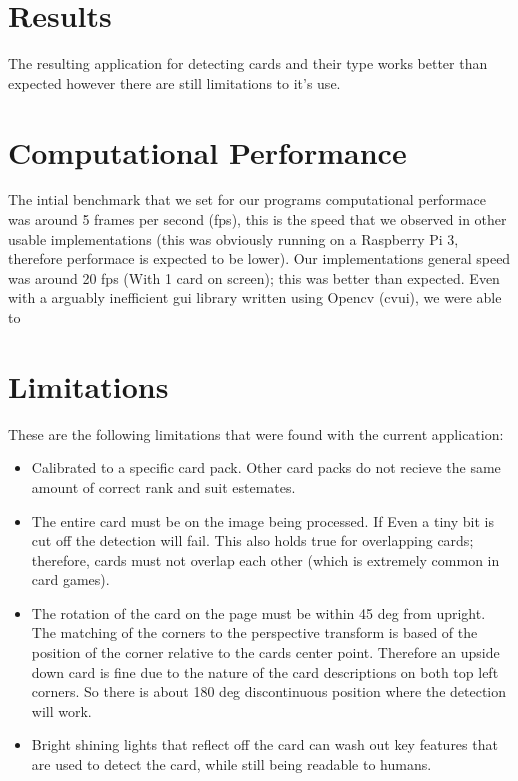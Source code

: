\documentclass[conference]{IEEEtran}
\begin{document}

\section{Results}
The resulting application for detecting cards and their type works better than expected however
there are still limitations to it's use.

\section{Computational Performance}
The intial benchmark that we set for our programs computational performace was around 5 frames per
second (fps), this is the speed that we observed in other usable implementations
\cite{opencv-card-detection} (this was obviously running on a Raspberry Pi 3, therefore performace
is expected to be lower). Our implementations general speed was around 20 fps (With 1 card on
screen); this was better than expected. Even with a arguably inefficient gui library written using
Opencv (cvui), we were able to 

\section{Limitations}
These are the following limitations that were found with the current application:
\begin{itemize}
\item Calibrated to a specific card pack. Other card packs do not recieve the same amount of correct
        rank and suit estemates.
\item The entire card must be on the image being processed. If Even a tiny bit is cut off the
        detection will fail. This also holds true for overlapping cards; therefore, cards must not
        overlap each other (which is extremely common in card games).
\item The rotation of the card on the page must be within 45 deg from upright. The matching of the
        corners to the perspective transform is based of the position of the corner relative to the
        cards center point. Therefore an upside down card is fine due to the nature of the card
        descriptions on both top left corners. So there is about 180 deg discontinuous position
        where the detection will work.
\item Bright shining lights that reflect off the card can wash out key features that are used to
        detect the card, while still being readable to humans.
\end{itemize}
\end{document}
